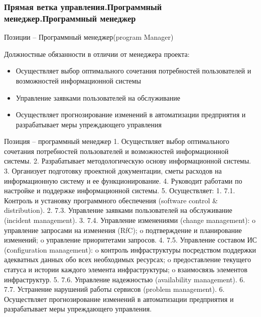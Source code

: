 \documentclass{../industrial-development}
\begin{document}
\begin{frame} \frametitle{Прямая ветка управления.Программный менеджер.Программный менеджер}
 \begin{block}{}
  \alert{Позиции – Программный менеджер(program Manager)}

Должностные обязанности в отличии от менеджера проекта: 
  \end{block}
  \begin{itemize}
  \item Осуществляет выбор оптимального сочетания потребностей пользователей и возможностей информационной системы
 \item Управление заявками пользователей на обслуживание
 \item Осуществляет прогнозирование изменений в автоматизации предприятия и разрабатывает меры упреждающего управления
  \end{itemize}
\end{frame}

\lecturenotes

Позиция – программный менеджер
1.	Осуществляет выбор оптимального сочетания потребностей пользователей и возможностей информационной системы.
2.	Разрабатывает методологическую основу информационной системы.
3.	Организует подготовку проектной документации, сметы расходов на информационную систему и ее функционирование.
4.	Руководит работами по настройке и поддержке информационной системы.
5.	Осуществляет:
1.	7.1. Контроль и установку программного обеспечения (software control & distribution).
2.	7.3. Управление заявками пользователей на обслуживание (incident management).
3.	7.4. Управление изменениями (change management):
o	управление запросами на изменения (RfC);
o	подтверждение и планирование изменений;
o	управление приоритетами запросов.
4.	7.5. Управление составом ИС (сonfiguration management):
o	контроль инфраструктуры посредством поддержки адекватных данных обо всех необходимых ресурсах;
o	предоставление текущего статуса и истории каждого элемента инфраструктуры;
o	взаимосвязь элементов инфраструктур.
5.	7.6. Управление надежностью (availability management).
6.	7.7. Устранение нарушений работы сервисов (problem management).
6.	Осуществляет прогнозирование изменений в автоматизации предприятия и разрабатывает меры упреждающего управления.
\end{document}
